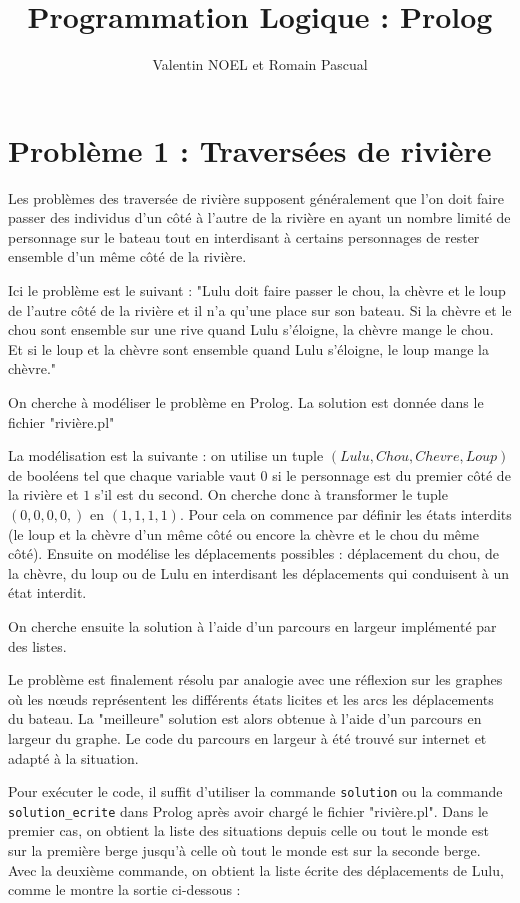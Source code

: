 \documentclass[12pt,a4paper]{article}
\title{Programmation Logique : Prolog}
\author{Valentin NOEL et Romain Pascual}
\begin{document}
\maketitle

\section{Problème 1 : Traversées de rivière}
Les problèmes des traversée de rivière supposent généralement que l'on doit faire passer des individus d'un côté à l'autre de la rivière en ayant un nombre limité de personnage sur le bateau tout en interdisant à certains personnages de rester ensemble d'un même côté de la rivière.

Ici le problème est le suivant : "Lulu doit faire passer le chou, la chèvre et le loup de l'autre côté de la rivière et il n'a qu'une place sur son bateau. Si la chèvre et le chou sont ensemble sur une rive quand Lulu s'éloigne, la chèvre mange le chou. Et si le loup et la chèvre sont ensemble quand Lulu s'éloigne, le loup mange la chèvre."

On cherche à modéliser le problème en Prolog. La solution est donnée dans le fichier "rivière.pl"

La modélisation est la suivante : on utilise un tuple $(Lulu, Chou, Chevre, Loup)$ de booléens tel que chaque variable vaut $0$ si le personnage est du premier côté de la rivière et $1$ s'il est du second. On cherche donc à transformer le tuple $(0,0,0,0,)$ en $(1,1,1,1)$. Pour cela on commence par définir les états interdits (le loup et la chèvre d'un même côté ou encore la chèvre et le chou du même côté). Ensuite on modélise les déplacements possibles : déplacement du chou, de la chèvre, du loup ou de Lulu en interdisant les déplacements qui conduisent à un état interdit.

On cherche ensuite la solution à l'aide d'un parcours en largeur implémenté par des listes.

Le problème est finalement résolu par analogie avec une réflexion sur les graphes où les nœuds représentent les différents états licites et les arcs les déplacements du bateau. La "meilleure" solution est alors obtenue à l'aide d'un parcours en largeur du graphe. Le code du parcours en largeur à été trouvé sur internet et adapté à la situation.

Pour exécuter le code, il suffit d'utiliser la commande \texttt{solution} ou la commande \texttt{solution\_ecrite} dans Prolog après avoir chargé le fichier "rivière.pl". Dans le premier cas, on obtient la liste des situations depuis celle ou tout le monde est sur la première berge jusqu'à celle où tout le monde est sur la seconde berge. Avec la deuxième commande, on obtient la liste écrite des déplacements de Lulu, comme le montre la sortie ci-dessous :
\end{document}
